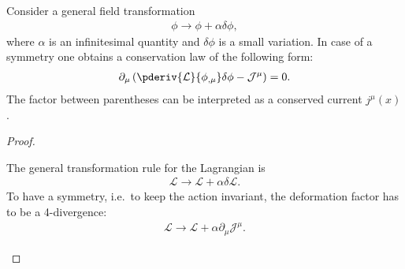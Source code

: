     \begin{theorem}\label{field:noethers_theorem}
        Consider a general field transformation
        \begin{gather}
            \phi\longrightarrow\phi+\alpha\delta\phi,
        \end{gather}
        where $\alpha$ is an infinitesimal quantity and $\delta\phi$ is a small variation. In case of a symmetry one obtains a conservation law of the following form:
        \begin{gather}
            \label{field:conserved_current}
            \partial_\mu\left(\pderiv{\mathcal{L}}{\phi_{,\mu}}\delta\phi - \mathcal{J}^\mu\right) = 0.
        \end{gather}
        The factor between parentheses can be interpreted as a conserved current $j^\mu(x)$.\\
        \begin{proof}
            \begin{mdframed}[roundcorner=10pt, linecolor=blue, linewidth=1pt]
                The general transformation rule for the Lagrangian is
                \begin{gather}
                    \label{noether_deriv:1}
                    \mathcal{L}\longrightarrow\mathcal{L} + \alpha\delta\mathcal{L}.
                \end{gather}
                To have a symmetry, i.e.~to keep the action invariant, the deformation factor has to be a 4-divergence:
                \begin{gather}
                    \label{noether_deriv:2}
                    \mathcal{L}\longrightarrow\mathcal{L} + \alpha\partial_\mu\mathcal{J}^\mu.
                \end{gather}


\end{mdframed}
\end{proof}
\end{theorem}
